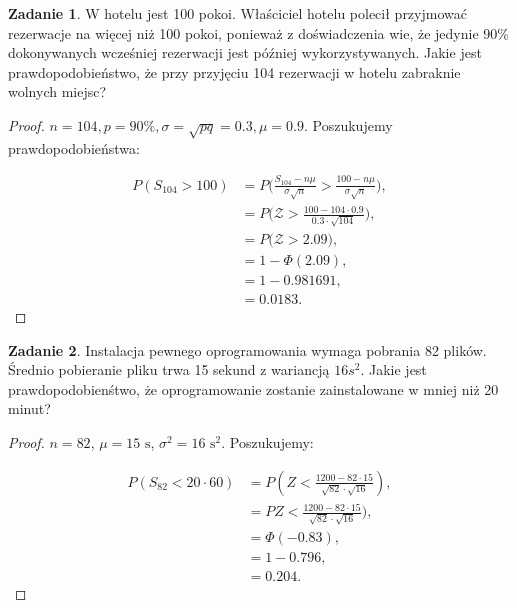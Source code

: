 \documentclass[11pt]{article}
\theoremstyle{definition}
\newtheorem{zadanie}{Zadanie}
\begin{document}
\begin{zadanie}
    W hotelu jest 100 pokoi. Właściciel hotelu polecił przyjmować rezerwacje na więcej niż 100 pokoi, ponieważ z doświadczenia wie, że jedynie 90\% dokonywanych wcześniej rezerwacji jest później wykorzystywanych. Jakie jest prawdopodobieństwo, że przy przyjęciu 104 rezerwacji w hotelu zabraknie wolnych miejsc?
\end{zadanie}

\begin{proof}
    $n = 104, p=90\%, \sigma = \sqrt{pq}=0.3, \mu=0.9$. Poszukujemy prawdopodobieństwa:

    \begin{align*}P(S_{104} > 100) &= P\Bigg( \frac{S_{104} - n\mu}{\sigma\sqrt n} > \frac{100 - n\mu}{\sigma\sqrt n}\Bigg),\\
        &= P\Bigg(\mathcal Z > \frac{100 - 104\cdot0.9}{0.3\cdot\sqrt{104}}\Bigg),\\ 
        &= P\Bigg(\mathcal Z > 2.09\Bigg),\\ 
        &= 1- \Phi(2.09),\\
        &= 1 - 0.981691,\\
        &= 0.0183.
    \end{align*}
\end{proof}

\begin{zadanie}
    Instalacja pewnego oprogramowania wymaga pobrania 82 plików. Średnio pobieranie pliku trwa 15 sekund z wariancją $16 s^2$. Jakie jest prawdopodobienśtwo, że oprogramowanie zostanie zainstalowane w mniej niż 20 minut?
\end{zadanie}
\begin{proof}
    $n=82$, $\mu=15\text{ s}$, $\sigma^2 = 16\text{ s}^2$. Poszukujemy:

    \begin{align*}
        P(S_{82}<20\cdot60) & = P( Z < \frac{1200-82\cdot15}{\sqrt{82}\cdot\sqrt{16}}), \\
                            & = P Z < \frac{1200-82\cdot15}{\sqrt{82}\cdot\sqrt{16}}),  \\
                            & = \Phi(-0.83),                                            \\
                            & = 1 - 0.796,                                              \\
                            & = 0.204.
    \end{align*}
\end{proof}
\end{document}
